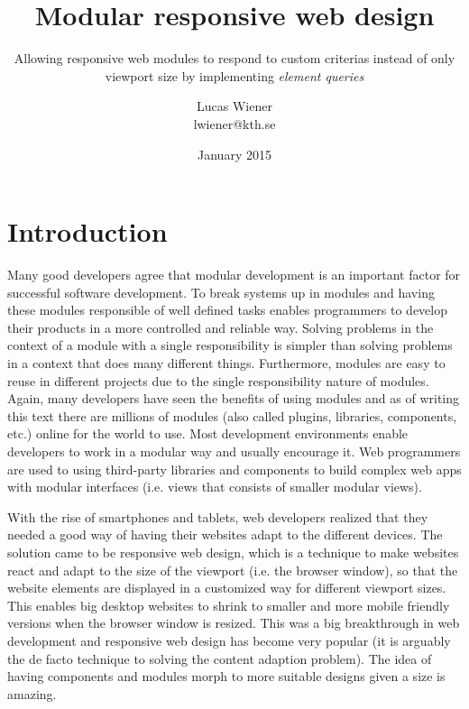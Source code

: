 \documentclass[oneside,a4paper,11pt]{kth-mag}
\title{Modular responsive web design}
\subtitle{Allowing responsive web modules to respond to custom criterias instead of only viewport size by implementing \emph{element queries}}
\author{Lucas Wiener \\ \lowercase{lwiener@kth.se}}
\date{January 2015}
\begin{document}
\frontmatter
\pagestyle{empty}
\removepagenumbers
\maketitle
\mainmatter
\section*{Introduction}

Many good developers agree that modular development is an important factor for successful software development. To break systems up in modules and having these modules responsible of well defined tasks enables programmers to develop their products in a more controlled and reliable way. Solving problems in the context of a module with a single responsibility is simpler than solving problems in a context that does many different things. Furthermore, modules are easy to reuse in different projects due to the single responsibility nature of modules. Again, many developers have seen the benefits of using modules and as of writing this text there are millions of modules (also called plugins, libraries, components, etc.) online for the world to use. Most development environments enable developers to work in a modular way and usually encourage it. Web programmers are used to using third-party libraries and components to build complex web apps with modular interfaces (i.e. views that consists of smaller modular views).

With the rise of smartphones and tablets, web developers realized that they needed a good way of having their websites adapt to the different devices. The solution came to be responsive web design, which is a technique to make websites react and adapt to the size of the viewport (i.e. the browser window), so that the website elements are displayed in a customized way for different viewport sizes. This enables big desktop websites to shrink to smaller and more mobile friendly versions when the browser window is resized. This was a big breakthrough in web development and responsive web design has become very popular (it is arguably the de facto technique to solving the content adaption problem). The idea of having components and modules morph to more suitable designs given a size is amazing.
\end{document}

